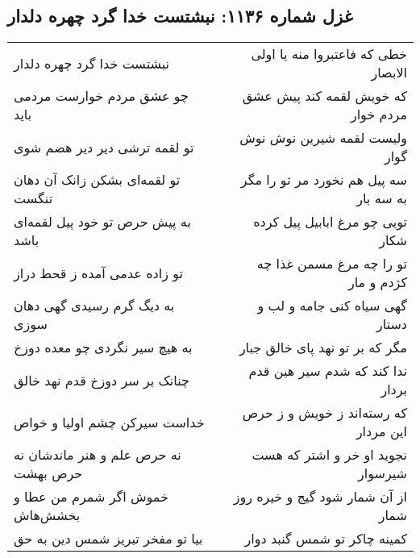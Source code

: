 \begin{center}
\section*{غزل شماره ۱۱۳۶: نبشتست خدا گرد چهره دلدار}
\label{sec:1136}
\begin{longtable}{l p{0.5cm} r}
نبشتست خدا گرد چهره دلدار
&&
خطی که فاعتبروا منه یا اولی الابصار
\\
چو عشق مردم خوارست مردمی باید
&&
که خویش لقمه کند پیش عشق مردم خوار
\\
تو لقمه ترشی دیر دیر هضم شوی
&&
ولیست لقمه شیرین نوش نوش گوار
\\
تو لقمه‌ای بشکن زانک آن دهان تنگست
&&
سه پیل هم نخورد مر تو را مگر به سه بار
\\
به پیش حرص تو خود پیل لقمه‌ای باشد
&&
تویی چو مرغ ابابیل پیل کرده شکار
\\
تو زاده عدمی آمده ز قحط دراز
&&
تو را چه مرغ مسمن غذا چه کژدم و مار
\\
به دیگ گرم رسیدی گهی دهان سوزی
&&
گهی سیاه کنی جامه و لب و دستار
\\
به هیچ سیر نگردی چو معده دوزخ
&&
مگر که بر تو نهد پای خالق جبار
\\
چنانک بر سر دوزخ قدم نهد خالق
&&
ندا کند که شدم سیر هین قدم بردار
\\
خداست سیرکن چشم اولیا و خواص
&&
که رسته‌اند ز خویش و ز حرص این مردار
\\
نه حرص علم و هنر ماندشان نه حرص بهشت
&&
نجوید او خر و اشتر که هست شیرسوار
\\
خموش اگر شمرم من عطا و بخشش‌هاش
&&
از آن شمار شود گیج و خیره روز شمار
\\
بیا تو مفخر تبریز شمس دین به حق
&&
کمینه چاکر تو شمس گنبد دوار
\\
\end{longtable}
\end{center}

